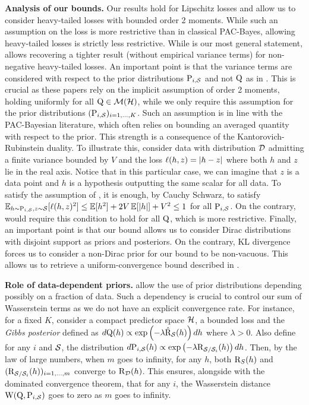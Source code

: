 \textbf{Analysis of our bounds.} Our results hold for Lipschitz losses and allow us to consider heavy-tailed losses with bounded order 2 moments.
While such an assumption on the loss is more restrictive than in classical PAC-Bayes, allowing heavy-tailed losses is strictly less restrictive. 
While  is our most general statement,  allows recovering a tighter result (without empirical variance terms) for non-negative heavy-tailed losses. 
An important point is that the variance terms are considered with respect to the prior distributions $\P_{i,\S}$  and not $\Q$ as in \cite{haddouche2023pac,chugg2023unified}. This is crucial as these papers rely on the implicit assumption of order 2 moments, holding uniformly for all $\Q\in\Mcal(\H)$, while we only require this assumption for the prior distributions $(\P_{i,\S})_{i=1,\dots,K}$.
Such an assumption is in line with the PAC-Bayesian literature, which often relies on bounding an averaged quantity with respect to the prior.
This strength is a consequence of the Kantorovich-Rubinstein duality.
To illustrate this, consider \iid data with distribution $\D$ admitting a finite variance bounded by $V$ and the loss $\loss(h,z)= |h-z|$ where both $h$ and $z$ lie in the real axis.
Notice that in this particular case, we can imagine that $z$ is a data point and $h$ is a hypothesis outputting the same scalar for all data.
To satisfy the assumption of , it is enough, by Cauchy Schwarz, to satisfy  $\EE_{h\sim \P_{i,\S},z\sim\S}[\loss(h,z)^2] \le \EE[h^2] + 2V\EE[|h|] +V^2 \leq 1$ for all $\P_{i,\S}$.
On the contrary, \cite{haddouche2023pac,chugg2023unified} would require this condition to hold for all $\Q$, which is more restrictive.
Finally, an important point is that our bound allows us to consider Dirac distributions with disjoint support as priors and posteriors.
On the contrary, KL divergence forces us to consider a non-Dirac prior for our bound to be non-vacuous. 
This allows us to retrieve a uniform-convergence bound described in .

\textbf{Role of data-dependent priors.} 
 allow the use of prior distributions depending possibly on a fraction of data.
Such a dependency is crucial to control our sum of Wasserstein terms as we do not have an explicit convergence rate.
For instance, for a fixed $K$, consider a compact predictor space $\H$, a bounded loss and the \emph{Gibbs posterior} defined as $d\Q(h) \propto \exp\left(-\lambda \Riskhat_{\S}(h)\right)dh$ where $\lambda>0$.
Also define for any $i$ and $\S$, the distribution $d\P_{i,\S}(h) \propto \exp\left(-\lambda \Risk_{\S/\S_i}(h)\right)dh$. Then, by the law of large numbers, when $m$ goes to infinity, for any $h$, both $\Risk_S(h)$ and $(\Risk_{\S/\S_i}(h))_{i=1,\dots,m}$ converge to $\Risk_\D(h)$. 
This ensures, alongside with the dominated convergence theorem, that for any $i$, the Wasserstein distance $\W(\Q,\P_{i,\S})$ goes to zero as $m$ goes to infinity.  

